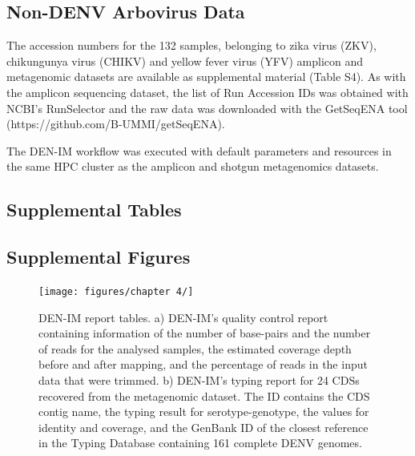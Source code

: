 \subsection{Non-DENV Arbovirus Data} \label{chap4_sup_non_denv}

The accession numbers for the 132 samples, belonging to zika virus (ZKV), chikungunya virus (CHIKV) and yellow fever virus (YFV) amplicon and metagenomic datasets are available as supplemental material (Table S4). As with the amplicon sequencing dataset, the list of Run Accession IDs was obtained with NCBI’s RunSelector and the raw data was downloaded with the GetSeqENA tool (https://github.com/B-UMMI/getSeqENA). 

The DEN-IM workflow was executed with default parameters and resources in the same HPC cluster as the amplicon and shotgun metagenomics datasets.

\subsection{Supplemental Tables} \label{chap4_sup_tables}

\subsection{Supplemental Figures} \label{chap4_sup_figures}

\begin{figure}[h!]
\centering
\texttt{[image: figures/chapter 4/]}
\caption{DEN-IM report tables. a) DEN-IM's quality control report containing information of the number of base-pairs and the number of reads for the analysed samples, the estimated coverage depth before and after mapping, and the percentage of reads in the input data that were trimmed. b) DEN-IM's typing report for 24 CDSs recovered from the metagenomic dataset. The ID contains the CDS contig name, the typing result for serotype-genotype, the values for identity and coverage, and the GenBank ID of the closest reference in the Typing Database containing 161 complete DENV genomes.}
\label{fig:chap4_figure_sup1}
\end{figure}